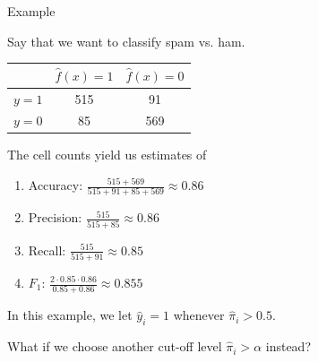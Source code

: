 \documentclass[10pt,handout]{beamer}
\begin{document}
\begin{frame}{Example}

Say that we want to classify spam vs. ham. \\[3mm]\pause

\begin{center}
\begin{tabular}{ l | c | c }
  & $\hat{f}(x)=1$ & $\hat{f}(x)=0$\\
  \hline
  $y=1$ & 515 & 91 \\
  $y=0$ & 85 & 569 \\
  \hline
\end{tabular}
\end{center}
The cell counts yield us estimates of
\begin{enumerate}
\item Accuracy: $\frac{515+569}{515+91+85+569}\approx 0.86$
\item Precision: $\frac{515}{515+85}\approx 0.86$
\item Recall: $\frac{515}{515+91}\approx 0.85$
\item $F_1$: $\frac{2 \cdot 0.85 \cdot 0.86}{0.85 + 0.86}\approx 0.855$
\end{enumerate}

\pause

In this example, we let $\hat{y}_i=1$ whenever $\hat{\pi}_i>0.5$.

What if we choose another cut-off level $\hat{\pi}_i>\alpha$ instead?

\end{frame}
\end{document}
